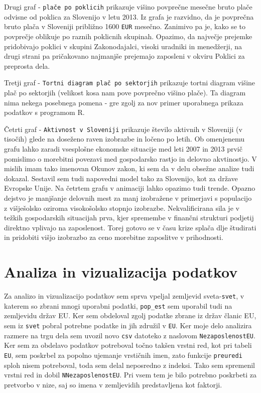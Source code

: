 \documentclass[11pt,a4paper]{article}
\begin{document}
Drugi graf - \verb|plače po poklicih| prikazuje višino povprečne mesečne bru\-to plače odvisne od poklica za Slovenijo v letu 2013. Iz grafa je razvidno, da je povprečna bruto plača v Sloveniji približno 1600 \verb|EUR| mesečno. Zanimivo pa je, kako se to povprečje oblikuje po raznih poklicnih skupinah. Opazimo, da največje prejemke pridobivajo poklici v skupini Zakonodajalci, visoki uradniki in menedžerji, na drugi strani pa pričakovano najmanjše prejemajo zaposleni v okviru Poklici za preprosta dela.

Tretji graf - \verb|Tortni diagram plač po sektorjih| prikazuje tortni diagram višine plač po sektorjih (velikost kosa nam pove povprečno višino plače). Ta diagram nima nekega posebnega pomena - gre zgolj za nov primer uporabnega prikaza podatkov s programom R.

Četrti graf - \verb|Aktivnost v Sloveniji| prikazuje šte\-vilo aktivnih v Sloveniji (v tisočih) glede na doseženo raven izobrazbe in ločeno po letih. Ob omenjenemu grafu lahko zaradi vsesplošne ekonomske situacije med leti 2007 in 2013 prvič pomislimo o morebitni povezavi med gospodarsko rastjo in delovno akvtinostjo. V mislih imam tako imenovan Okunov zakon, ki sem da v delu obsežne analize tudi dokazal. Sestavil sem tudi napovedni model tako za Slovenijo, kot za države Evropske Unije. Na četrtem grafu v animaciji lahko opazimo tudi trende. Opazno dejstvo je manjšanje delovnih mest za manj izobražene v primerjavi s populacijo z višješolsko oziroma visokošolsko stopnjo izobrazbe. Nekvalificirana sila je v težkih gospodarskih situacijah prva, kjer spremembe v finančni strukturi podjetij direktno vplivajo na zaposlenost. Torej gotovo se v času krize splača dlje študirati in pridobiti višjo izobrazbo za ceno morebitne zaposlitve v prihodnosti.

\pagebreak
\section{Analiza in vizualizacija podatkov}

Za analizo in vizualizacijo podatkov sem sprva vpeljal zemljevid sveta-\verb|svet|, v katerem so zbrani mnogi uporabni podatki, \verb|pop_est| sem uporabil tudi na zemljevidu držav EU. Ker sem obdeloval zgolj podatke zbrane iz držav članic EU, sem iz \verb|svet| pobral potrebne podatke in jih združil v \verb|EU|. Ker moje delo analizira razmere na trgu dela sem uvozil novo \verb|csv| datoteko z naslovom \verb|NezaposlenostEU|. Ker sem za obdelavo podatkov potreboval točno takšen vrstni red, kot pri tabeli \verb|EU|, sem poskrbel za popolno ujemanje vrstičnih imen, zato funkcije \verb|preuredi| sploh nisem potreboval, toda sem delal neposredno z indeksi. Tako sem spremenil vrstni red in dobil \verb|NNezaposlenostEU|. Pri vsem tem je bilo potrebno poskrbeti za pretvorbo v nize, saj so imena v zemljevidih predstavljena kot faktorji. 
\end{document}
